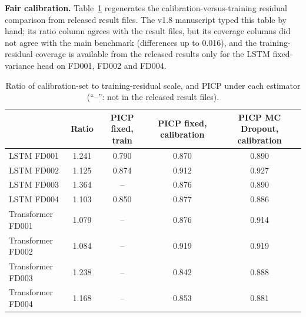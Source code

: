 \documentclass[10pt,a4paper]{article}
\begin{document}
\noindent\textbf{Fair calibration.} Table~\ref{tab:fair} regenerates the calibration-versus-training residual comparison from released result files. The v1.8 manuscript typed this table by hand; its ratio column agrees with the result files, but its coverage columns did not agree with the main benchmark (differences up to 0.016), and the training-residual coverage is available from the released results only for the LSTM fixed-variance head on FD001, FD002 and FD004.
\begin{table}[H]\centering\footnotesize
\caption{Ratio of calibration-set to training-residual scale, and PICP under each estimator (``--'': not in the released result files).}\label{tab:fair}
\begin{tabular}{lcccc}\toprule
 & Ratio & PICP fixed, train & PICP fixed, calibration & PICP MC Dropout, calibration \\ \midrule
LSTM FD001 & 1.241 & 0.790 & 0.870 & 0.890 \\
LSTM FD002 & 1.125 & 0.874 & 0.912 & 0.927 \\
LSTM FD003 & 1.364 & -- & 0.876 & 0.890 \\
LSTM FD004 & 1.103 & 0.850 & 0.877 & 0.886 \\
Transformer FD001 & 1.079 & -- & 0.876 & 0.914 \\
Transformer FD002 & 1.084 & -- & 0.919 & 0.919 \\
Transformer FD003 & 1.238 & -- & 0.842 & 0.888 \\
Transformer FD004 & 1.168 & -- & 0.853 & 0.881 \\
\bottomrule\end{tabular}
\end{table}

\FloatBarrier
\end{document}
